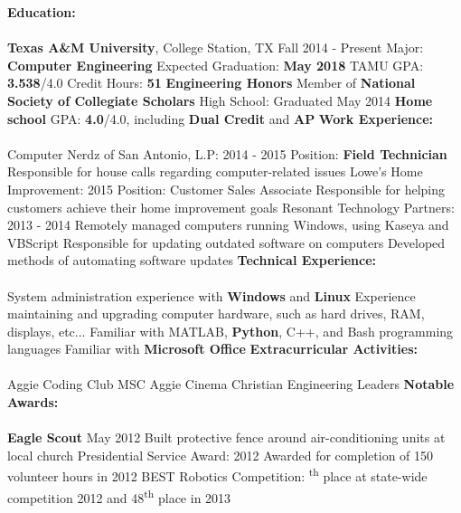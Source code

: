 \documentclass[12pt]{article}
\newcommand{\upspace}{\vspace{0px}}
\newcommand{\zzz}[1]{\upspace \0 \textbf{#1} \\ \vspace{-0.7\baselineskip} \hrulefill \vspace{-2px} \\ }
\newcommand{\aaa}{\upspace \1}
\newcommand{\bbb}{\upspace \2}
\begin{document}
\begin{flushleft}
\begin{outline}[compactitem]
\zzz{Education:}
	\aaa \textbf{Texas A\&M University}, College Station, TX \hfill Fall 2014 - Present
		\bbb Major: \textbf{Computer Engineering}
		\bbb Expected Graduation: \textbf{May 2018}
		\bbb TAMU GPA: \textbf{3.538}/4.0
		\bbb Credit Hours: \textbf{51}
		\bbb \textbf{Engineering Honors}
		\bbb Member of \textbf{National Society of Collegiate Scholars}
	\aaa High School: \hfill Graduated May 2014
		\bbb \textbf{Home school}
		\bbb GPA: \textbf{4.0}/4.0, including \textbf{Dual Credit} and \textbf{AP}
\zzz{Work Experience:}
	\aaa Computer Nerdz of San Antonio, L.P: \hfill 2014 - 2015
		\bbb Position: \textbf{Field Technician}
		\bbb Responsible for house calls regarding computer-related issues
	\aaa Lowe's Home Improvement: \hfill 2015
		\bbb Position: Customer Sales Associate
		\bbb Responsible for helping customers achieve their home improvement goals
	\aaa Resonant Technology Partners: \hfill 2013 - 2014
		\bbb Remotely managed computers running Windows, using Kaseya and VBScript
		\bbb Responsible for updating outdated software on computers
		\bbb Developed methods of automating software updates
\zzz{Technical Experience:}
	\aaa System administration experience with \textbf{Windows} and \textbf{Linux}
	\aaa Experience maintaining and upgrading computer hardware, such as hard drives, RAM, displays, etc...
	\aaa Familiar with MATLAB, \textbf{Python}, C++, and Bash programming languages
	\aaa Familiar with \textbf{Microsoft Office}
\zzz{Extracurricular Activities:}
	\aaa Aggie Coding Club
	\aaa MSC Aggie Cinema
	\aaa Christian Engineering Leaders
\zzz{Notable Awards:}
	\aaa \textbf{Eagle Scout} \hfill May 2012
		\bbb Built protective fence around air-conditioning units at local church
	\aaa Presidential Service Award: \hfill 2012
		\bbb Awarded for completion of 150 volunteer hours in 2012
	\aaa BEST Robotics Competition:
		\bbb 5\textsuperscript{th} place at state-wide competition 2012 and 48\textsuperscript{th} place in 2013
\end{outline}
\end{flushleft}
\end{document}
